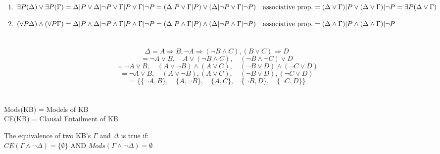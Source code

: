 \documentclass{article}
\begin{document}
\section{}
\renewcommand{\labelenumi}{(\alph{enumi})}
 \begin{enumerate}
   \item $\exists P (\Delta) \lor \exists P (\Gamma) \\
   = \Delta | P \lor \Delta | \lnot P \lor \Gamma | P \lor \Gamma | \lnot P \\
   = (\Delta | P \lor \Gamma | P) \lor (\Delta | \lnot P \lor \Gamma | \lnot P) \quad \textrm{associative prop.}\\
   = (\Delta \lor \Gamma) | P \lor (\Delta \lor \Gamma) | \lnot P \\
   = \exists P (\Delta \lor \Gamma) $
   \item $ (\forall P \Delta) \land (\forall P \Gamma) \\
   = \Delta | P \land \Delta | \lnot P \land \Gamma | P \land \Gamma | \lnot P \\
   = (\Delta | P \land \Gamma | P) \land (\Delta | \lnot P \land \Gamma | \lnot P) \quad \textrm{associative prop.}\\
   = (\Delta \land \Gamma) | P \land (\Delta \land \Gamma) | \lnot P$
 \end{enumerate}

 \clearpage
 \section{}
 \[\Delta = A \Rightarrow B, \lnot A \Rightarrow (\lnot B \land C), (B \lor C) \Rightarrow D\]
 \[= \lnot A \lor B, \quad A \lor (\lnot B \land C), \quad (\lnot B \land \lnot C) \lor D\]
 \[= \lnot A \lor B, \quad (A \lor \lnot B) \land (A \lor C), \quad (\lnot B \lor D) \land (\lnot C \lor D)\]
 \[= \lnot A \lor B, \quad (A \lor \lnot B), (A \lor C), \quad (\lnot B \lor D), (\lnot C \lor D)\]
 \[= \{\{\lnot A, B\}, \quad \{A, \lnot B\}, \quad \{A, C\}, \quad \{\lnot B, D\}, \quad \{\lnot C, D\}\}\]
 
 \clearpage
 \section{}
 Mods(KB) = Models of KB \\
 CE(KB) = Clausal Entailment of KB\\
 \begin{center}
 The equivalence of two KB's $\Gamma$ and $\Delta$ is true if:\\
 $CE(\Gamma \land \lnot \Delta) = \{\emptyset\}$ AND $Mods(\Gamma \land \lnot \Delta) = \emptyset$
 \end{center}
 
\end{document}
